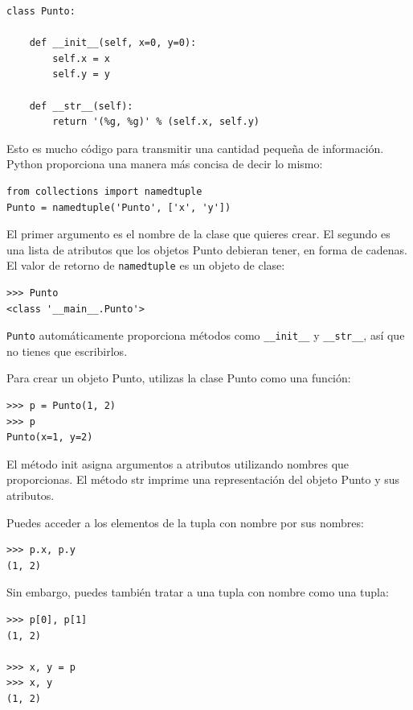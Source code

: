 \documentclass[10pt]{book}
\begin{document}
\begin{verbatim}
class Punto:

    def __init__(self, x=0, y=0):
        self.x = x
        self.y = y

    def __str__(self):
        return '(%g, %g)' % (self.x, self.y)
\end{verbatim}

Esto es mucho código para transmitir una cantidad pequeña de información.
Python proporciona una manera más concisa de decir lo mismo:

\begin{verbatim}
from collections import namedtuple
Punto = namedtuple('Punto', ['x', 'y'])
\end{verbatim}

El primer argumento es el nombre de la clase que quieres crear.
El segundo es una lista de atributos que los objetos Punto debieran tener,
en forma de cadenas.  El valor de retorno de {\tt namedtuple} es un objeto de clase:

\begin{verbatim}
>>> Punto
<class '__main__.Punto'>
\end{verbatim}

{\tt Punto} automáticamente proporciona métodos como \verb"__init__" y
\verb"__str__", así que no tienes que escribirlos.

Para crear un objeto Punto, utilizas la clase Punto como una función:

\begin{verbatim}
>>> p = Punto(1, 2)
>>> p
Punto(x=1, y=2)
\end{verbatim}

El método init asigna argumentos a atributos utilizando nombres
que proporcionas.  El método str imprime una representación del objeto Punto
y sus atributos.

Puedes acceder a los elementos de la tupla con nombre por sus nombres:

\begin{verbatim}
>>> p.x, p.y
(1, 2)
\end{verbatim}

Sin embargo, puedes también tratar a una tupla con nombre como una tupla:

\begin{verbatim}
>>> p[0], p[1]
(1, 2)

>>> x, y = p
>>> x, y
(1, 2)
\end{verbatim}
\end{document}
